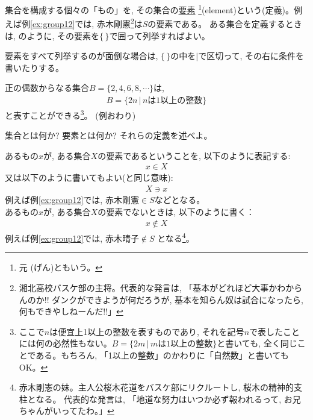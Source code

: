 集合を構成する個々の「もの」を, その集合の\underline{要素}
\footnote{元 (げん)ともいう。}(element)という(定義)。例えば例\ref{ex:group12}では, 
赤木剛憲\footnote{湘北高校バスケ部の主将。代表的な発言は, 
「基本がどれほど大事かわからんのか!! ダンクができようが何だろうが, 
基本を知らん奴は試合になったら, 何もできやしねーんだ!!」}は$S$の要素である。
ある集合を定義するときは, のように, その要素を$\{\, \}$で囲って列挙すればよい。

要素をすべて列挙するのが面倒な場合は, 
$\{\, \}$の中を$|$で区切って, その右に条件を書いたりする。

\begin{exmpl}\label{ex:group3}
正の偶数からなる集合$B=\{2, 4, 6, 8, \cdots\}$は, 
\begin{eqnarray}
B=\{2n\,|\,n \text{は1以上の整数}\}
\end{eqnarray}
と表すことができる\footnote{ここで$n$は便宜上1以上の整数を表すものであり, それを記号$n$で表したこと
には何の必然性もない。$B=\{2m\,|\,m \text{は1以上の整数}\}$と書いても, 全く同じことである。もちろん, 
「1以上の整数」のかわりに「自然数」と書いてもOK。}。
(例おわり)\end{exmpl}
\mv

\begin{q}\label{q:alg_set_def}
集合とは何か? 要素とは何か? それらの定義を述べよ。
\end{q}\mv

あるもの$x$が, ある集合$X$の要素であるということを, 以下のように表記する:
\begin{eqnarray}x \in X\label{eq:algebra_set5}\end{eqnarray}
又は以下のように書いてもよい(と同じ意味):
\begin{eqnarray}X \ni x\end{eqnarray}
例えば例\ref{ex:group12}では, $\text{赤木剛憲} \in S$などとなる。\\

あるもの$x$が, ある集合$X$の要素でないときは, 以下のように書く：
\begin{eqnarray}x \notin X\end{eqnarray}
例えば例\ref{ex:group12}では, $\text{赤木晴子} \notin S$
となる\footnote{赤木剛憲の妹。主人公桜木花道をバスケ部にリクルートし, 桜木の精神的支柱となる。
代表的な発言は, 「地道な努力はいつか必ず報われるって, お兄ちゃんがいってたわ。」}。\\

\begin{freqmiss}{\small{}}\end{freqmiss}


